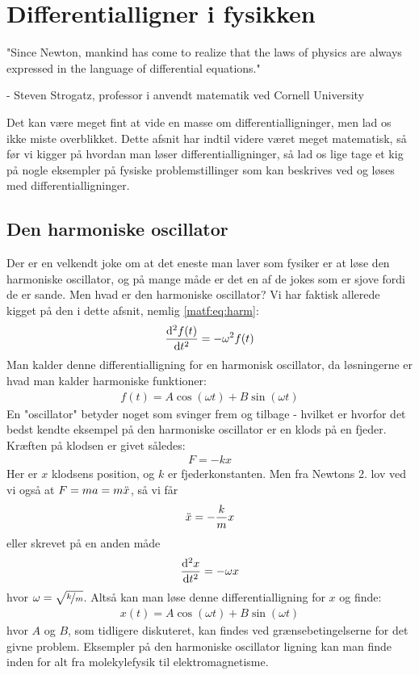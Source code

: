 \documentclass[crop=false, class=memoir]{standalone}
\begin{document}
\section{Differentialligner i fysikken}

"Since Newton, mankind has come to realize that the laws of physics are always expressed in the language of differential equations."

- Steven Strogatz, professor i anvendt matematik ved Cornell University

Det kan være meget fint at vide en masse om differentialligninger, men lad os ikke miste overblikket. Dette afsnit har indtil videre været meget matematisk, så før vi kigger på hvordan man løser differentialligninger, så lad os lige tage et kig på nogle eksempler på fysiske problemstillinger som kan beskrives ved og løses med differentialligninger. 

\subsection{Den harmoniske oscillator}

Der er en velkendt joke om at det eneste man laver som fysiker er at løse den harmoniske oscillator, og på mange måde er det en af de jokes som er sjove fordi de er sande. Men hvad er den harmoniske oscillator? Vi har faktisk allerede kigget på den i dette afsnit, nemlig \cref{matf:eq:harm}:
\begin{align}
    \dv[2]{f(t)}{t} = - \omega^2 f(t)
\end{align}
Man kalder denne differentialligning for en harmonisk oscillator, da løsningerne er hvad man kalder harmoniske funktioner:
\begin{align}
    f(t) = A\cos{(\omega t)} + B \sin{(\omega t)}
\end{align}
En "oscillator" betyder noget som svinger frem og tilbage - hvilket er hvorfor det bedst kendte eksempel på den harmoniske oscillator er en klods på en fjeder. Kræften på klodsen er givet således:
\begin{align}
    F = -k x
\end{align}
Her er $x$ klodsens position, og $k$ er fjederkonstanten. Men fra Newtons 2. lov ved vi også at $F = ma = m\Ddot{x}$, så vi får
\begin{align}
    \Ddot{x} = -\frac{k}{m}x
\end{align}
eller skrevet på en anden måde
\begin{align}
    \dv[2]{x}{t} = -\omega x
\end{align}
hvor $\omega = \sqrt{\nicefrac{k}{m}}$. Altså kan man løse denne differentialligning for $x$ og finde:
\begin{align}
    x(t) = A\cos{(\omega t)} + B \sin{(\omega t)}
\end{align}
hvor $A$ og $B$, som tidligere diskuteret, kan findes ved grænsebetingelserne for det givne problem. Eksempler på den harmoniske oscillator ligning kan man finde inden for alt fra molekylefysik til elektromagnetisme.
\end{document}
